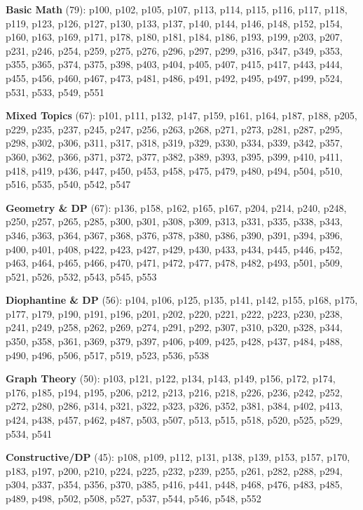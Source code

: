 \noindent\textbf{Basic Math} (79): p100, p102, p105, p107, p113, p114, p115, p116, p117, p118, p119, p123, p126, p127, p130, p133, p137, p140, p144, p146, p148, p152, p154, p160, p163, p169, p171, p178, p180, p181, p184, p186, p193, p199, p203, p207, p231, p246, p254, p259, p275, p276, p296, p297, p299, p316, p347, p349, p353, p355, p365, p374, p375, p398, p403, p404, p405, p407, p415, p417, p443, p444, p455, p456, p460, p467, p473, p481, p486, p491, p492, p495, p497, p499, p524, p531, p533, p549, p551\par\smallskip
\noindent\textbf{Mixed Topics} (67): p101, p111, p132, p147, p159, p161, p164, p187, p188, p205, p229, p235, p237, p245, p247, p256, p263, p268, p271, p273, p281, p287, p295, p298, p302, p306, p311, p317, p318, p319, p329, p330, p334, p339, p342, p357, p360, p362, p366, p371, p372, p377, p382, p389, p393, p395, p399, p410, p411, p418, p419, p436, p447, p450, p453, p458, p475, p479, p480, p494, p504, p510, p516, p535, p540, p542, p547\par\smallskip
\noindent\textbf{Geometry \& DP} (67): p136, p158, p162, p165, p167, p204, p214, p240, p248, p250, p257, p265, p285, p300, p301, p308, p309, p313, p331, p335, p338, p343, p346, p363, p364, p367, p368, p376, p378, p380, p386, p390, p391, p394, p396, p400, p401, p408, p422, p423, p427, p429, p430, p433, p434, p445, p446, p452, p463, p464, p465, p466, p470, p471, p472, p477, p478, p482, p493, p501, p509, p521, p526, p532, p543, p545, p553\par\smallskip
\noindent\textbf{Diophantine \& DP} (56): p104, p106, p125, p135, p141, p142, p155, p168, p175, p177, p179, p190, p191, p196, p201, p202, p220, p221, p222, p223, p230, p238, p241, p249, p258, p262, p269, p274, p291, p292, p307, p310, p320, p328, p344, p350, p358, p361, p369, p379, p397, p406, p409, p425, p428, p437, p484, p488, p490, p496, p506, p517, p519, p523, p536, p538\par\smallskip
\noindent\textbf{Graph Theory} (50): p103, p121, p122, p134, p143, p149, p156, p172, p174, p176, p185, p194, p195, p206, p212, p213, p216, p218, p226, p236, p242, p252, p272, p280, p286, p314, p321, p322, p323, p326, p352, p381, p384, p402, p413, p424, p438, p457, p462, p487, p503, p507, p513, p515, p518, p520, p525, p529, p534, p541\par\smallskip
\noindent\textbf{Constructive/DP} (45): p108, p109, p112, p131, p138, p139, p153, p157, p170, p183, p197, p200, p210, p224, p225, p232, p239, p255, p261, p282, p288, p294, p304, p337, p354, p356, p370, p385, p416, p441, p448, p468, p476, p483, p485, p489, p498, p502, p508, p527, p537, p544, p546, p548, p552\par\smallskip
